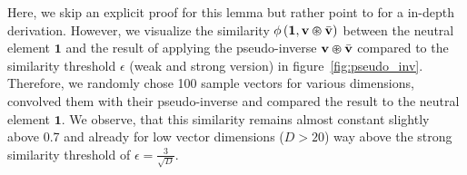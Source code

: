Here, we skip an explicit proof for this lemma but rather point to \textcite[Section 3.1.2 and 3.1.3]{Plate1994} for a in-depth derivation.
However, we visualize the similarity $\phi\left(\mathbf{1}, \mathbf{v} \varoast \bar{\mathbf{v}}\right)$ between the neutral element $\mathbf{1}$ and the result of applying the pseudo-inverse $ \mathbf{v} \varoast \bar{\mathbf{v}}$ compared to the similarity threshold $\epsilon$ (weak and strong version) in figure~\ref{fig:pseudo_inv}.
Therefore, we randomly chose \num{100} sample vectors for various dimensions, convolved them with their pseudo-inverse and compared the result to the neutral element $\mathbf{1}$.
We observe, that this similarity remains almost constant slightly above \num{0.7} and already for low vector dimensions ($D > 20$) way above the strong similarity threshold of $\epsilon=\frac{3}{\sqrt{D}}$.


